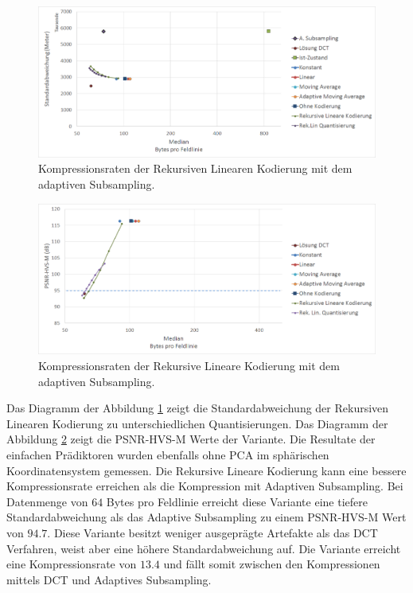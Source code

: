 \begin{figure}[!htbp]
	\center
	\includegraphics[width=1\textwidth,keepaspectratio]{./pictures/resultate/loesung2/variante2/resultate.png}
	
	\caption{Kompressionsraten der Rekursiven Linearen Kodierung mit dem adaptiven Subsampling.}
	\label{resultate:loesung2:adaptive:median}
\end{figure}
\begin{figure}[!htbp]
	\includegraphics[width=1\textwidth,keepaspectratio]{./pictures/resultate/loesung2/variante2/resultate_psnr.png}
	
	\caption{Kompressionsraten der Rekursive Lineare Kodierung mit dem adaptiven Subsampling.}
	\label{resultate:loesung2:adaptive:median_psnr}
\end{figure}
Das Diagramm der Abbildung \ref{resultate:loesung2:adaptive:median} zeigt die Standardabweichung der Rekursiven Linearen Kodierung zu unterschiedlichen Quantisierungen. Das Diagramm der Abbildung \ref{resultate:loesung2:adaptive:median_psnr} zeigt die PSNR-HVS-M Werte der Variante. Die Resultate der einfachen Prädiktoren wurden ebenfalls ohne PCA im sphärischen Koordinatensystem gemessen. Die Rekursive Lineare Kodierung kann eine bessere Kompressionsrate erreichen als die Kompression mit Adaptiven Subsampling. Bei Datenmenge von $64$ Bytes pro Feldlinie erreicht diese Variante eine tiefere Standardabweichung als das Adaptive Subsampling zu einem PSNR-HVS-M Wert von $94.7$. Diese Variante besitzt weniger ausgeprägte Artefakte als das DCT Verfahren, weist aber eine höhere Standardabweichung auf. Die Variante erreicht eine Kompressionsrate von $13.4$ und fällt somit zwischen den Kompressionen mittels DCT und Adaptives Subsampling.

